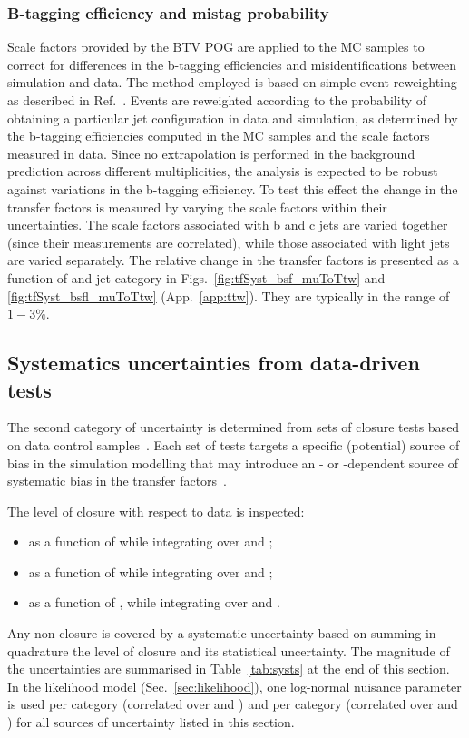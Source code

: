 \subsubsection{B-tagging efficiency and mistag probability}
\label{sec:tfSyst_btag}

Scale factors provided by the BTV POG are applied to the MC samples to
correct for differences in the b-tagging efficiencies and
misidentifications between simulation and data.  The method employed
is based on simple event reweighting as described in
Ref.~\cite{btagSFMethods}.  Events are reweighted according to the
probability of obtaining a particular jet configuration in data and
simulation, as determined by the b-tagging efficiencies computed in
the MC samples and the scale factors measured in data.  Since no
extrapolation is performed in the background prediction across
different \nb multiplicities, the analysis is expected to be robust
against variations in the b-tagging efficiency.  To test this effect
the change in the transfer factors is measured by varying the scale
factors within their uncertainties. The scale factors associated with
b and c jets are varied together (since their measurements are
correlated), while those associated with light jets are varied
separately.  The relative change in the transfer factors is presented
as a function of \scalht and jet category in
Figs.~\ref{fig:tfSyst_bsf_muToTtw} and \ref{fig:tfSyst_bsfl_muToTtw}
(App.~\ref{app:ttw}).  They are typically in the range of $1-3\%$.

\subsection{Systematics uncertainties from data-driven tests}
\label{sec:closure-tests}

The second category of uncertainty is determined from sets of closure
tests based on data control samples~\cite{RA1Paper2012}.  Each set of
tests targets a specific (potential) source of bias in the simulation
modelling that may introduce an \njet- or \scalht-dependent source of
systematic bias in the transfer factors~\cite{RA1Paper2012}.

The level of closure with respect to data is inspected:
\begin{itemize}
\item as a function of \njet while integrating over \scalht and \nb; 
\item as a function of \scalht while integrating over \njet and \nb;
\item as a function of \nb, while integrating over \njet and \scalht.
\end{itemize}
Any non-closure is covered by a systematic uncertainty based on
summing in quadrature the level of closure and its statistical
uncertainty. The magnitude of the uncertainties are summarised in
Table~\ref{tab:systs} at the end of this section. In the likelihood
model (Sec.~\ref{sec:likelihood}), one log-normal nuisance parameter
is used per \scalht category (\ie correlated over \njet and \nb) and
per \njet category (\ie correlated over \scalht and \nb) for all
sources of uncertainty listed in this section. 

